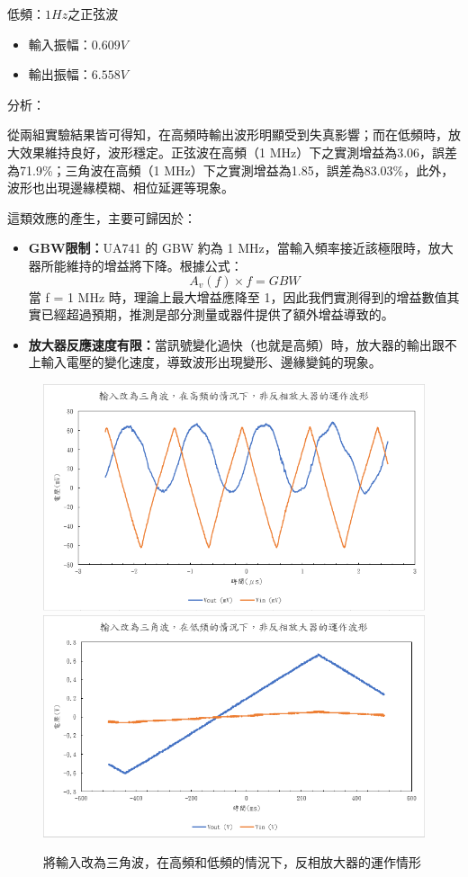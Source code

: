 \documentclass[12pt,a4paper]{article}
\begin{document}
\begin{CJK}{UTF8}{bkai}
\begin{enumerate}
低頻：$1Hz$之正弦波
\begin{itemize}
    \item 輸入振幅：$0.609V$
    \item 輸出振幅：$6.558V$
\end{itemize}

\noindent 分析：

從兩組實驗結果皆可得知，在高頻時輸出波形明顯受到失真影響；而在低頻時，放大效果維持良好，波形穩定。正弦波在高頻（1 MHz）下之實測增益為3.06，誤差為71.9\%；三角波在高頻（1 MHz）下之實測增益為1.85，誤差為83.03\%，此外，波形也出現邊緣模糊、相位延遲等現象。

這類效應的產生，主要可歸因於：
\begin{itemize}
    \item \textbf{GBW限制：}UA741 的 GBW 約為 1 MHz，當輸入頻率接近該極限時，放大器所能維持的增益將下降。根據公式：
    \begin{equation}
        A_v(f)\times f = GBW
    \end{equation}
    當 f = 1 MHz 時，理論上最大增益應降至 1，因此我們實測得到的增益數值其實已經超過預期，推測是部分測量或器件提供了額外增益導致的。
    \item \textbf{放大器反應速度有限：}當訊號變化過快（也就是高頻）時，放大器的輸出跟不上輸入電壓的變化速度，導致波形出現變形、邊緣變鈍的現象。
\end{itemize}

\begin{figure}[h]
    \centering
    \includegraphics[width=0.45\linewidth]{figures/non-ia/non-inverting amplifier_tri_high freq.png}
    \includegraphics[width=0.45\linewidth]{figures/non-ia/non-inverting amplifier_tri_low freq.png}
    \caption{將輸入改為三角波，在高頻和低頻的情況下，反相放大器的運作情形}
    \label{fig:non_IA_tri_freq}
\end{figure}


\end{enumerate}
\end{CJK}
\end{document}
